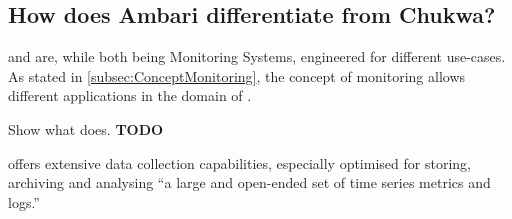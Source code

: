 \subsection{How does Ambari differentiate from Chukwa?}
\label{subsec:Differentiation}

\amb and \chuk are, while both being Monitoring Systems, engineered for different use-cases. 
As stated in \ref{subsec:ConceptMonitoring}, the concept of monitoring allows different applications in the domain of \isds. 

Show what \amb does. \textbf{TODO}


\chuk offers extensive data collection capabilities, especially optimised for storing, archiving and analysing ``a large and open-ended set of time series metrics and logs.''~\cite{Boulona}
